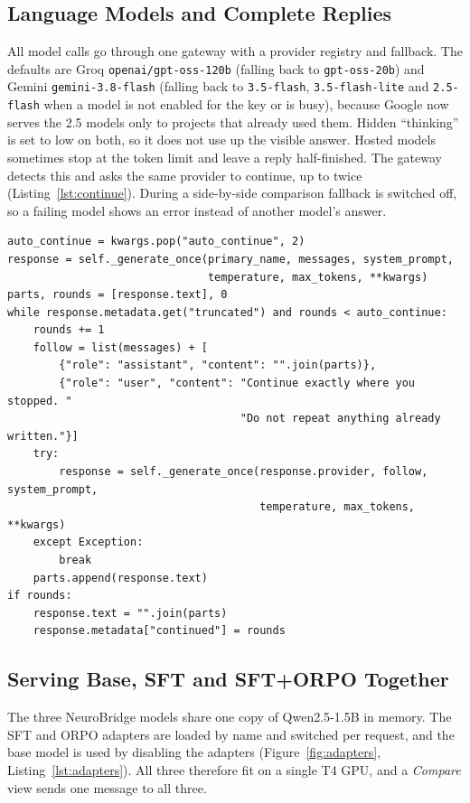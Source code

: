 \documentclass[11pt,a4paper]{article}
\newcommand{\code}[1]{\texttt{#1}}
\begin{document}
\subsection{Language Models and Complete Replies}
All model calls go through one gateway with a provider registry and fallback. The defaults are Groq
\code{openai/gpt-oss-120b} (falling back to \code{gpt-oss-20b}) and Gemini \code{gemini-3.8-flash}
(falling back to \code{3.5-flash}, \code{3.5-flash-lite} and \code{2.5-flash} when a model is not
enabled for the key or is busy), because Google now serves the 2.5 models only to projects that already
used them. Hidden ``thinking'' is set to low on both, so it does not use up the visible answer. Hosted models
sometimes stop at the token limit and leave a reply half-finished. The gateway detects this and asks the same
provider to continue, up to twice (Listing~\ref{lst:continue}). During a side-by-side comparison
fallback is switched off, so a failing model shows an error instead of another model's answer.

\par\noindent\begin{minipage}{\linewidth}\begin{lstlisting}[caption={Automatic continuation of replies cut off by the token limit (\code{agent/llm/gateway.py}).},label={lst:continue}]
auto_continue = kwargs.pop("auto_continue", 2)
response = self._generate_once(primary_name, messages, system_prompt,
                               temperature, max_tokens, **kwargs)
parts, rounds = [response.text], 0
while response.metadata.get("truncated") and rounds < auto_continue:
    rounds += 1
    follow = list(messages) + [
        {"role": "assistant", "content": "".join(parts)},
        {"role": "user", "content": "Continue exactly where you stopped. "
                                    "Do not repeat anything already written."}]
    try:
        response = self._generate_once(response.provider, follow, system_prompt,
                                       temperature, max_tokens, **kwargs)
    except Exception:
        break
    parts.append(response.text)
if rounds:
    response.text = "".join(parts)
    response.metadata["continued"] = rounds
\end{lstlisting}\end{minipage}\par

\subsection{Serving Base, SFT and SFT+ORPO Together}
The three NeuroBridge models share one copy of Qwen2.5-1.5B in memory. The SFT and ORPO
adapters are loaded by name and switched per request, and the base model is used by disabling the
adapters (Figure~\ref{fig:adapters}, Listing~\ref{lst:adapters}). All three therefore fit on a single T4
GPU, and a \emph{Compare} view sends one message to all three.
\end{document}
